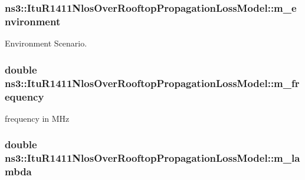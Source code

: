 \subsubsection[{\texorpdfstring{m\+\_\+environment}{m_environment}}]{ ns3\+::\+Itu\+R1411\+Nlos\+Over\+Rooftop\+Propagation\+Loss\+Model\+::m\+\_\+environment\hspace{0.3cm}{\ttfamily [private]}}\hypertarget{classns3_1_1ItuR1411NlosOverRooftopPropagationLossModel_a90b4674c71607edfaeeac8e473cd56ab}{}\label{classns3_1_1ItuR1411NlosOverRooftopPropagationLossModel_a90b4674c71607edfaeeac8e473cd56ab}


Environment Scenario. 

\subsubsection[{\texorpdfstring{m\+\_\+frequency}{m_frequency}}]{\setlength{\rightskip}{0pt plus 5cm}double ns3\+::\+Itu\+R1411\+Nlos\+Over\+Rooftop\+Propagation\+Loss\+Model\+::m\+\_\+frequency\hspace{0.3cm}{\ttfamily [private]}}\hypertarget{classns3_1_1ItuR1411NlosOverRooftopPropagationLossModel_a9849dc5d7532df7160aa171f3e20d8b7}{}\label{classns3_1_1ItuR1411NlosOverRooftopPropagationLossModel_a9849dc5d7532df7160aa171f3e20d8b7}


frequency in M\+Hz 

\subsubsection[{\texorpdfstring{m\+\_\+lambda}{m_lambda}}]{\setlength{\rightskip}{0pt plus 5cm}double ns3\+::\+Itu\+R1411\+Nlos\+Over\+Rooftop\+Propagation\+Loss\+Model\+::m\+\_\+lambda\hspace{0.3cm}{\ttfamily [private]}}\hypertarget{classns3_1_1ItuR1411NlosOverRooftopPropagationLossModel_ada44335d5ed036f43b68194cbbcc61f7}{}\label{classns3_1_1ItuR1411NlosOverRooftopPropagationLossModel_ada44335d5ed036f43b68194cbbcc61f7}


